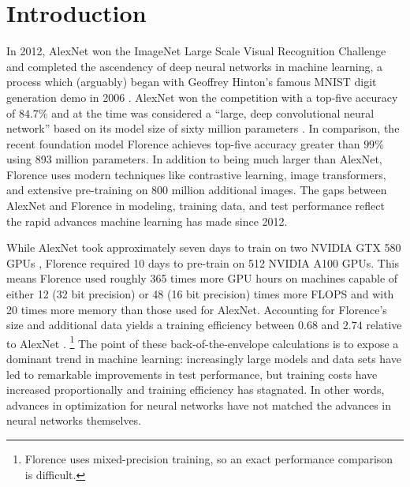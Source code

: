 
\chapter{Introduction}\label{chapter:introduction}

In 2012, AlexNet won the ImageNet Large Scale Visual Recognition Challenge
\citep{deng2009imagenet} and completed the ascendency of deep neural networks in
machine learning, a process which (arguably) began with Geoffrey Hinton's
famous MNIST digit generation demo in 2006 \citep{hinton2006deep}.
AlexNet won the competition with a top-five accuracy of \( 84.7\%  \) and at
the time was considered a ``large, deep convolutional neural network'' based on
its model size of sixty million parameters \citep{russakovksy2015imagenet}.
In comparison, the recent foundation model Florence
\citep{yuan2021florence} achieves top-five accuracy greater than \( 99\% \)
using 893 million parameters.
In addition to being much larger than AlexNet, Florence uses modern techniques
like contrastive learning, image transformers, and extensive pre-training on
800 million additional images.
The gaps between AlexNet and Florence in modeling, training data, and test
performance reflect the rapid advances machine learning has made since 2012.

While AlexNet took approximately seven days to train on two NVIDIA GTX 580 GPUs
\citep{krizhevksy2012alexnet}, Florence required 10 days to pre-train on 512
NVIDIA A100 GPUs.
This means Florence used roughly 365 times more GPU hours on machines capable
of either 12 (32 bit precision) or 48 (16 bit precision)
times more FLOPS and with 20 times more memory than those used for AlexNet.
Accounting for Florence's size and additional data yields a training
efficiency between \( 0.68 \) and \( 2.74 \) relative to AlexNet
\citep{a100, gpucomparison}.%
\footnote{Florence uses mixed-precision training, so an exact performance
    comparison is difficult.}
The point of these back-of-the-envelope calculations is to expose a dominant
trend in machine learning:
increasingly large models and data sets have led to remarkable improvements in
test performance, but training costs have increased proportionally and
training efficiency has stagnated.
In other words, advances in optimization for neural networks have not matched
the advances in neural networks themselves.

